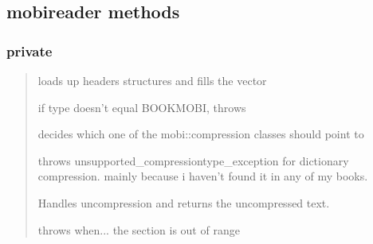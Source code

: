 \documentclass[letterpaper,10pt,english]{sphinxmanual}
\begin{document}
\subsection{mobireader methods}
\label{mobireader:mobireader-methods}

\subsubsection{private}
\label{mobireader:id1}\begin{quote}

\begin{fulllineitems}
\label{mobireader:parse_header}
loads up headers structures and fills the {\hyperref[mobireader:mobireader::section_offsets__vector:uint32_t:]{}} vector

if {\hyperref[mobireader:mobireader::db_header__st_palmdoc_db]{}} type doesn't equal BOOKMOBI, throws
{\hyperref[exceptions:mobi::invalid_file_exception]{}}

\end{fulllineitems}


\begin{fulllineitems}
\label{mobireader:set_compression}
decides which one of the mobi::compression classes should {\hyperref[mobireader:mobireader::reader__compressionP]{}} point to

throws unsupported\_compressiontype\_exception for dictionary compression.
mainly because i haven't found it in any of my books.

\end{fulllineitems}


\begin{fulllineitems}
\label{mobireader:mobireader::get_section_uncompressed__unsigned-iC}
Handles uncompression and returns the uncompressed text.

throws {\hyperref[exceptions:mobi::section_out_of_range_exception]{}}
when... the section is out of range


\end{fulllineitems}
\end{quote}
\end{document}
